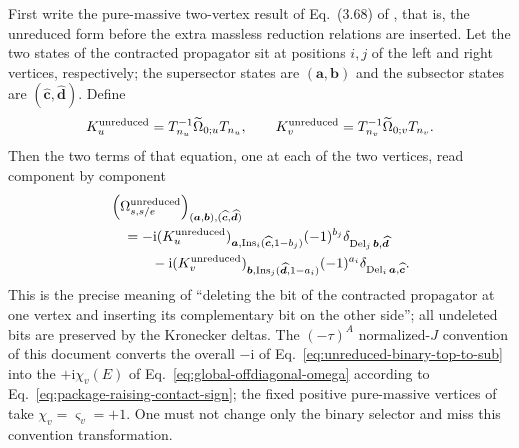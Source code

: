 \documentclass[11pt,a4paper]{article}
\newcommand{\ii}{\mathrm i}
\newcommand{\unred}{{\rm unreduced}}
\begin{document}
First write the pure-massive two-vertex result of Eq.~(3.68) of \cite{Chen:2023eic}, that is, the unreduced form before the extra massless reduction relations are inserted. Let the two states of the contracted propagator sit at positions $i,j$ of the left and right vertices, respectively; the supersector states are $(\bm a,\bm b)$ and the subsector states are $(\widehat{\bm c},\widehat{\bm d})$. Define
\begin{equation}
 K_u^{\unred}=T_{n_u}^{-1}\widetilde\Omega_{0;u}T_{n_u},
 \qquad
 K_v^{\unred}=T_{n_v}^{-1}\widetilde\Omega_{0;v}T_{n_v}.
 \label{eq:component-log-kernel}
\end{equation}
Then the two terms of that equation, one at each of the two vertices, read component by component
\begin{align}
 &\left(\Omega_{s,s/e}^{\unred}\right)_{(\bm a,\bm b),(\widehat{\bm c},\widehat{\bm d})}
 \notag\\
 &\quad=-\ii
 (K_u^{\unred})_{\bm a,\operatorname{Ins}_i(\widehat{\bm c},1-b_j)}
 (-1)^{b_j}
 \delta_{\operatorname{Del}_j\bm b,\widehat{\bm d}}
 \notag\\
 &\qquad\quad-\ii
 (K_v^{\unred})_{\bm b,\operatorname{Ins}_j(\widehat{\bm d},1-a_i)}
 (-1)^{a_i}
 \delta_{\operatorname{Del}_i\bm a,\widehat{\bm c}}.
 \label{eq:unreduced-binary-top-to-sub}
\end{align}
This is the precise meaning of ``deleting the bit of the contracted propagator at one vertex and inserting its complementary bit on the other side''; all undeleted bits are preserved by the Kronecker deltas. The $(-\tau)^A$ normalized-$J$ convention of this document converts the overall $-\ii$ of Eq.~\eqref{eq:unreduced-binary-top-to-sub} into the $+\ii\chi_v(E)$ of Eq.~\eqref{eq:global-offdiagonal-omega} according to Eq.~\eqref{eq:package-raising-contact-sign}; the fixed positive pure-massive vertices of \cite{Chen:2023eic} take $\chi_v=\varsigma_v=+1$. One must not change only the binary selector and miss this convention transformation.
\end{document}
